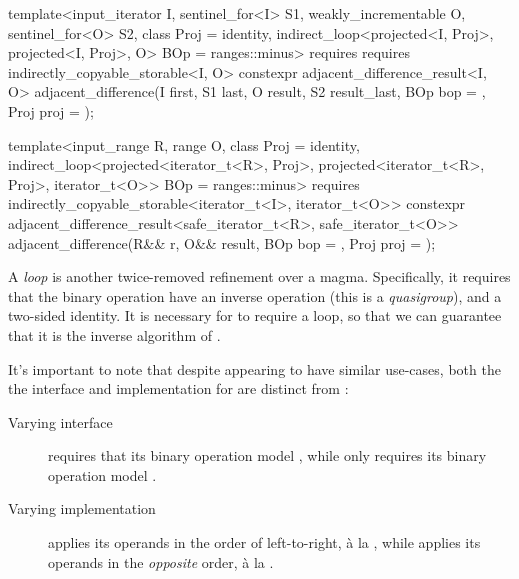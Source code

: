 \begin{itemdecl}
template<input_iterator I, sentinel_for<I> S1, weakly_incrementable O, sentinel_for<O> S2,
         class Proj = identity,
         indirect_loop<projected<I, Proj>, projected<I, Proj>, O> BOp = ranges::minus>
  requires requires indirectly_copyable_storable<I, O>
constexpr adjacent_difference_result<I, O>
  adjacent_difference(I first, S1 last, O result, S2 result_last, BOp bop = {}, Proj proj = {});

template<input_range R, range O, class Proj = identity,
         indirect_loop<projected<iterator_t<R>, Proj>,
                       projected<iterator_t<R>, Proj>,
                       iterator_t<O>> BOp = ranges::minus>
  requires indirectly_copyable_storable<iterator_t<I>, iterator_t<O>>
constexpr adjacent_difference_result<safe_iterator_t<R>, safe_iterator_t<O>>
  adjacent_difference(R&& r, O&& result, BOp bop = {}, Proj proj = {});
\end{itemdecl}
\begin{itemdescr}
   \pnum
   A \textit{loop} is another twice-removed refinement over a magma. Specifically, it requires that
   the binary operation have an inverse operation (this is a
   \textit{quasigroup}\cite{wikipedia_quasigroup}), and a two-sided identity. It is necessary for
    to require a loop, so that we can guarantee that it is the inverse
   algorithm of .

   It's important to note that despite appearing to have similar use-cases, both the the interface
   and implementation for  are distinct from
   :

   \begin{description}
      \item[Varying interface]
          requires that its binary operation model
         , while  only
         requires its binary operation model
         .
      \item[Varying implementation]
          applies its operands in the order of left-to-right, à la
         , while  applies its operands in the
         \textit{opposite} order, à la .
   \end{description}
\end{itemdescr}

